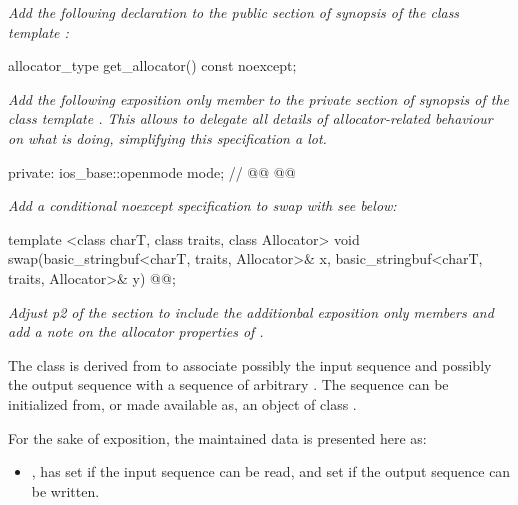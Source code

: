\documentclass[ebook,11pt,article]{memoir}
\renewcommand{\iref}[1]{[#1]}
\begin{document}
\textit{Add the following declaration to the public section of synopsis of the class template :}
\begin{addedblock}
\begin{codeblock}
    allocator_type get_allocator() const noexcept;
\end{codeblock}
\end{addedblock}

\textit{Add the following exposition only member to the private section of synopsis of the class template . This allows to delegate all details of allocator-related behaviour on what  is doing, simplifying this specification a lot.}
\begin{codeblock}
  private:
    ios_base::openmode mode;  // \expos
    @@
    @@
\end{codeblock}

\textit{Add a conditional noexcept specification to swap with see below:}
\begin{codeblock}
  template <class charT, class traits, class Allocator>
    void swap(basic_stringbuf<charT, traits, Allocator>& x,
              basic_stringbuf<charT, traits, Allocator>& y) @@;
\end{codeblock}

\emph{Adjust p2 of the section to include the additionbal exposition only members and add a note on the allocator properties of .}

\pnum
The class
is derived from
to associate possibly the input sequence and possibly
the output sequence with a sequence of arbitrary
.
The sequence can be initialized from, or made available as, an object of class
.


\pnum
For the sake of exposition, the maintained data  is presented here as:
\begin{itemize}
\item
{},
has
set if the input sequence can be read, and
set if the output sequence can be written.
\end{itemize}
\end{document}
